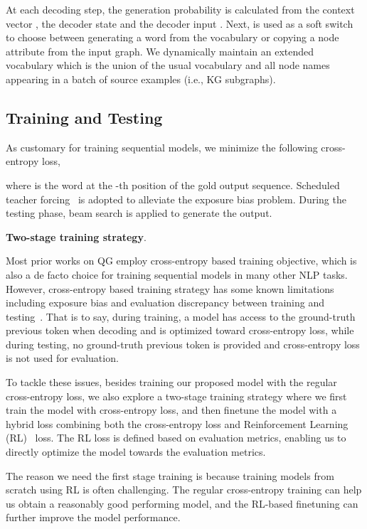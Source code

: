 \documentclass[journal]{IEEEtran}
\begin{document}
At each decoding step,
the generation probability  is calculated from the context vector , the decoder state  and the decoder input .
Next,  is used as a soft switch to choose between generating a word from the vocabulary or copying a node attribute from the input graph.
We dynamically maintain an extended vocabulary which is the union of the usual vocabulary and all node names appearing in a batch of source examples (i.e., KG subgraphs).




\subsection{Training and Testing}
As customary for training sequential models,
we minimize the following cross-entropy loss,
\vspace{-1mm}

\vspace{-1mm}
where  is the word at the -th position of the gold output sequence.
Scheduled teacher forcing~\cite{bengio2015scheduled} is adopted to alleviate the exposure bias problem.
During the testing phase, beam search is applied to generate the output.



\noindent\textbf{Two-stage training strategy}.

Most prior works on QG employ cross-entropy based training objective, which is also a de facto choice for training sequential models in many other NLP tasks.
However, cross-entropy based training strategy has some known limitations including exposure bias and evaluation discrepancy between training and testing~\cite{ranzato2015sequence,wu2016google,paulus2017deep}.
That is to say, during training, a model has access to the ground-truth previous token when decoding and is optimized toward cross-entropy loss, while during testing, 
no ground-truth previous token is provided and cross-entropy loss is not used for evaluation.


To tackle these issues, besides training our proposed model with the regular cross-entropy loss, we also explore a two-stage training strategy where we first train the model with cross-entropy loss, and then finetune the model with a hybrid loss combining both the cross-entropy loss and Reinforcement Learning (RL)~\cite{williams1992simple} loss.
The RL loss is defined based on evaluation metrics, enabling us to directly optimize the model towards the evaluation metrics.

The reason we need the first stage training is because training models from scratch using RL is often challenging. The regular cross-entropy training can help us obtain a reasonably good performing model, and the RL-based finetuning can further improve the model performance.
\end{document}
